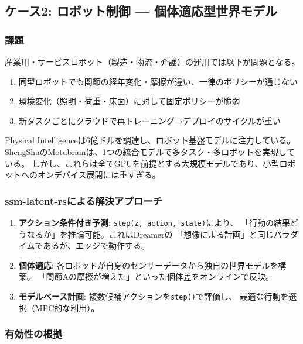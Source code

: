 \documentclass[11pt,a4paper]{ltjsarticle}
\begin{document}
\subsection{ケース2: ロボット制御 --- 個体適応型世界モデル}

\subsubsection{課題}

産業用・サービスロボット（製造・物流・介護）の運用では以下が問題となる。

\begin{enumerate}
  \item 同型ロボットでも関節の経年変化・摩擦が違い、一律のポリシーが通じない
  \item 環境変化（照明・荷重・床面）に対して固定ポリシーが脆弱
  \item 新タスクごとにクラウドで再トレーニング→デプロイのサイクルが重い
\end{enumerate}

Physical Intelligenceは$6$億ドルを調達し、ロボット基盤モデルに注力している\cite{notboring2026worldmodels}。
ShengShuのMotubrainは、1つの統合モデルで多タスク・多ロボットを実現している\cite{motubrain}。
しかし、これらは全てGPUを前提とする大規模モデルであり、小型ロボットへのオンデバイス展開には重すぎる。

\subsubsection{ssm-latent-rsによる解決アプローチ}

\begin{enumerate}
  \item \textbf{アクション条件付き予測}: \texttt{step(z, action, state)}により、
    「行動の結果どうなるか」を推論可能。これはDreamer\cite{hafner2023dreamerv3}の
    「想像による計画」と同じパラダイムであるが、エッジで動作する。
  \item \textbf{個体適応}: 各ロボットが自身のセンサーデータから独自の世界モデルを構築。
    「関節Aの摩擦が増えた」といった個体差をオンラインで反映。
  \item \textbf{モデルベース計画}: 複数候補アクションを\texttt{step()}で評価し、
    最適な行動を選択（MPC的な利用）。
\end{enumerate}

\subsubsection{有効性の根拠}
\end{document}
